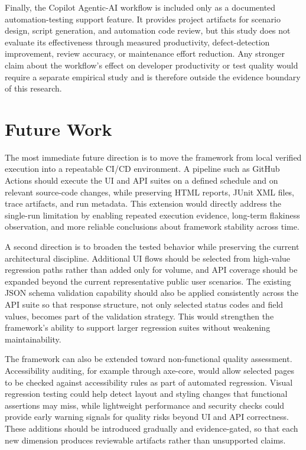 Finally, the Copilot Agentic-AI workflow is included only as a documented automation-testing support feature. It provides project artifacts for scenario design, script generation, and automation code review, but this study does not evaluate its effectiveness through measured productivity, defect-detection improvement, review accuracy, or maintenance effort reduction. Any stronger claim about the workflow's effect on developer productivity or test quality would require a separate empirical study and is therefore outside the evidence boundary of this research.

\section{Future Work}
\label{sec:ch6-future-work}

The most immediate future direction is to move the framework from local verified execution into a repeatable CI/CD environment. A pipeline such as GitHub Actions should execute the UI and API suites on a defined schedule and on relevant source-code changes, while preserving HTML reports, JUnit XML files, trace artifacts, and run metadata. This extension would directly address the single-run limitation by enabling repeated execution evidence, long-term flakiness observation, and more reliable conclusions about framework stability across time.

A second direction is to broaden the tested behavior while preserving the current architectural discipline. Additional UI flows should be selected from high-value regression paths rather than added only for volume, and API coverage should be expanded beyond the current representative public user scenarios. The existing JSON schema validation capability should also be applied consistently across the API suite so that response structure, not only selected status codes and field values, becomes part of the validation strategy. This would strengthen the framework's ability to support larger regression suites without weakening maintainability.

The framework can also be extended toward non-functional quality assessment. Accessibility auditing, for example through axe-core, would allow selected pages to be checked against accessibility rules as part of automated regression. Visual regression testing could help detect layout and styling changes that functional assertions may miss, while lightweight performance and security checks could provide early warning signals for quality risks beyond UI and API correctness. These additions should be introduced gradually and evidence-gated, so that each new dimension produces reviewable artifacts rather than unsupported claims.

